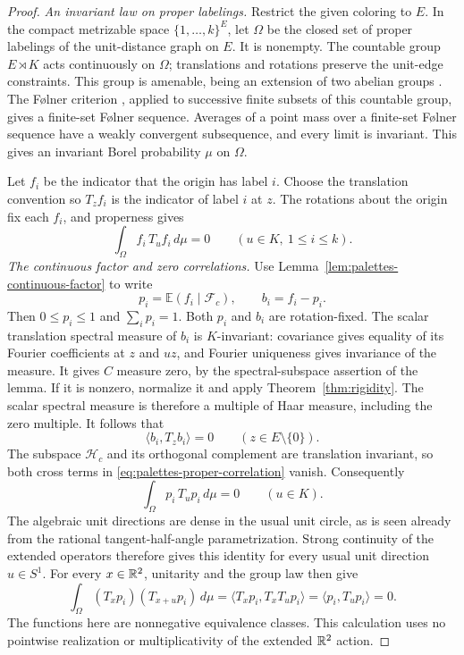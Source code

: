 \begin{proof}
\emph{An invariant law on proper labelings.}
Restrict the given coloring to \(E\).  In the compact metrizable space
\(\{1,\ldots,k\}^E\), let \(\Omega\) be the closed set of proper
labelings of the unit-distance graph on \(E\).  It is nonempty.
The countable group \(E\rtimes K\) acts continuously on \(\Omega\);
translations and rotations preserve the unit-edge constraints.
This group is amenable, being an extension of two abelian groups
\citep[Theorem~G.2.1 and Proposition~G.2.2(ii)]{Bekka2008}.
The F{\o}lner criterion \citep[Theorem~G.5.1]{Bekka2008},
applied to successive finite subsets of this countable group, gives
a finite-set F{\o}lner sequence.
Averages of a point mass over a finite-set F{\o}lner sequence have a
weakly convergent subsequence, and every limit is invariant.  This
gives an invariant Borel probability \(\mu\) on \(\Omega\).

Let \(f_i\) be the indicator that the origin has label \(i\).
Choose the translation convention so \(T_zf_i\) is the indicator
of label \(i\) at \(z\).  The rotations about the origin fix each
\(f_i\), and properness gives
\begin{equation}\label{eq:palettes-proper-correlation}
 \int_\Omega f_i\,T_uf_i\,d\mu=0
 \qquad (u\in K,\ 1\le i\le k).
\end{equation}
\smallskip
\noindent\emph{The continuous factor and zero correlations.}
Use Lemma~\ref{lem:palettes-continuous-factor} to write
\[
 p_i=\mathbb E(f_i\mid\mathcal F_c),\qquad b_i=f_i-p_i.
\]
Then \(0\le p_i\le1\) and \(\sum_i p_i=1\).
Both \(p_i\) and \(b_i\) are rotation-fixed.  The scalar translation
spectral measure of \(b_i\) is \(K\)-invariant: covariance gives
equality of its Fourier coefficients at \(z\) and \(uz\), and
Fourier uniqueness gives invariance of the measure.  It gives \(C\) measure zero, by the spectral-subspace assertion of the lemma.
If it is nonzero, normalize it and apply Theorem~\ref{thm:rigidity}.
The scalar spectral measure is therefore a multiple of Haar measure,
including the zero multiple.  It follows that
\[
 \langle b_i,T_zb_i\rangle=0\qquad(z\in E\setminus\{0\}).
\]
The subspace \(\mathcal H_c\) and its orthogonal complement are
translation invariant, so both cross terms in
\eqref{eq:palettes-proper-correlation} vanish.  Consequently
\[
 \int_\Omega p_i\,T_up_i\,d\mu=0\qquad(u\in K).
\]
The algebraic unit directions are dense in the usual unit circle,
as is seen already from the rational tangent-half-angle parametrization.
Strong continuity of the extended operators therefore gives this
identity for every usual unit direction \(u\in S^1\).
For every \(x\in\mathbb R^2\), unitarity and the group law then give
\begin{equation}\label{eq:palettes-field-correlation}
 \int_\Omega (T_xp_i)(T_{x+u}p_i)\,d\mu
 =\langle T_xp_i,T_xT_up_i\rangle
 =\langle p_i,T_up_i\rangle=0 .
\end{equation}
The functions here are nonnegative equivalence classes.
This calculation uses no pointwise realization or multiplicativity
of the extended \(\mathbb R^2\) action.


\end{proof}
